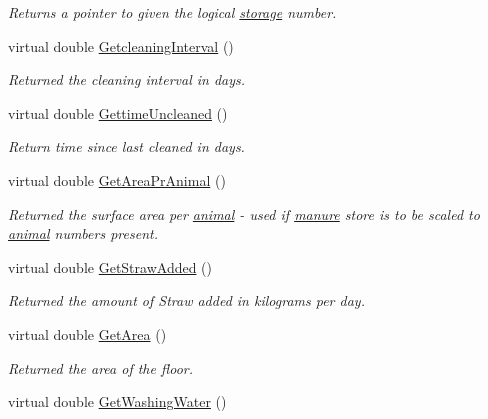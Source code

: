 \begin{DoxyCompactItemize}
\begin{DoxyCompactList}\small\item\em Returns a pointer to given the logical \hyperlink{classstorage}{storage} number. \item\end{DoxyCompactList}\item 
virtual double \hyperlink{classfloorstore_ad6d22909cdeef814833b7e37d136fca6}{GetcleaningInterval} ()
\begin{DoxyCompactList}\small\item\em Returned the cleaning interval in days. \item\end{DoxyCompactList}\item 
virtual double \hyperlink{classfloorstore_a93f174dcbbf14e77c16d482dbb46a464}{GettimeUncleaned} ()
\begin{DoxyCompactList}\small\item\em Return time since last cleaned in days. \item\end{DoxyCompactList}\item 
virtual double \hyperlink{classfloorstore_a6bcde59d5cf3b9c00f87eefbd675faa2}{GetAreaPrAnimal} ()
\begin{DoxyCompactList}\small\item\em Returned the surface area per \hyperlink{classanimal}{animal} -\/ used if \hyperlink{classmanure}{manure} store is to be scaled to \hyperlink{classanimal}{animal} numbers present. \item\end{DoxyCompactList}\item 
virtual double \hyperlink{classfloorstore_a90e0034ad69a88d43933153640ec7661}{GetStrawAdded} ()
\begin{DoxyCompactList}\small\item\em Returned the amount of Straw added in kilograms per day. \item\end{DoxyCompactList}\item 
virtual double \hyperlink{classfloorstore_a0b3cedc553507a2a14ba4e3bbc4bc850}{GetArea} ()
\begin{DoxyCompactList}\small\item\em Returned the area of the floor. \item\end{DoxyCompactList}\item 
virtual double \hyperlink{classfloorstore_a5b13ea82d1f8662ac8b117574cb24e6d}{GetWashingWater} ()

\end{DoxyCompactItemize}
